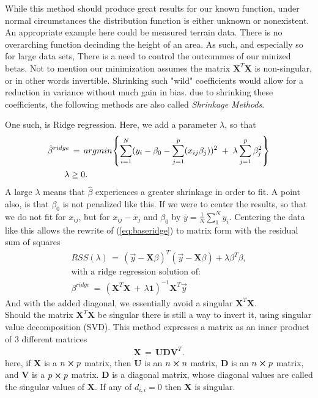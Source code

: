 \documentclass[ 12pt, a4paper ]{article}
\begin{document}
While this method should produce great results for our known function, under normal 
circumstances the distribution function is either unknown or nonexistent. An appropriate 
example here could be measured terrain data. There is no overarching function decinding the 
height of an area. As such, and especially so for large data sets, There is a need to control 
the outcommes of our minized betas. Not to mention our minimization assumes the matrix
$\mathbf{X}^T\mathbf{X}$ is non-singular, or in other words invertible. 
Shrinking such "wild" coefficients would allow for a reduction in variance without much gain
in bias. due to shrinking these coefficients, the following methods are also called 
\textit{Shrinkage Methods}. 

One such, is Ridge regression. Here, we add a parameter $\lambda$, so that 
\begin{align}
    \hat{\beta}^{ridge} &\,=\, 
    argmin\qty{ \sum_{i=1}^N (y_i - \beta_0 - \sum_{j=1}^p(x_{ij}\beta_j) )^2 
        \;+\; \lambda \sum_{j=1}^p \beta_j^2 }\label{eq:baseridge} \\
    \lambda &\geq 0. \nonumber
\end{align}
A large $\lambda$ means that $\hat{\beta}$ experiences a greater shrinkage in order to fit.
A point also, is that $\beta_0$ is not penalized like this. If we were to center the results, 
so that we do not fit for $x_{ij}$, but for $x_{ij} - \overline{x}_j$ and $\beta_0$ by 
$ \overline{y} = \frac{1}{N} \sum_1^N y_i$. %
Centering the data like this allows the rewrite of (\ref{eq:baseridge}) to matrix form
with the residual sum of squares
\begin{align}
    RSS(\lambda) \,=\, (\vec{y} - \mathbf{X}\beta)^T (\vec{y} - \mathbf{X}\beta)
        +   \lambda \beta^T\beta, \\
    \text{with a ridge regression solution of:}\nonumber \\
    \beta^{ridge} \,=\, (\mathbf{X}^T\mathbf{X} \,+\, \lambda \mathbf{1})^{-1}\mathbf{X}^T\vec{y}
    \label{eq:ridgesol}
\end{align}
And with the added diagonal, we essentially avoid a singular $\mathbf{X}^T\mathbf{X}$.\\

Should the matrix $\mathbf{X}^T \mathbf{X}$ be singular there is still a way to invert it, 
using singular value decomposition (SVD). This method expresses a matrix as an inner product 
of 3 different matrices\cite{}%
\begin{align}
    \mathbf{X} \,=\, \mathbf{U}\mathbf{D}\mathbf{V}^T.\label{eq:svdX}
\end{align}
here, if $\mathbf{X}$ is a $n\cross p$ matrix, then $\mathbf{U}$ is an $n \cross n$ matrix, 
$\mathbf{D}$ is an $n\cross p$ matrix, and $\mathbf{V}$ is a $p\cross p$ matrix. $\mathbf{D}$
is a diagonal matrix, whose diagonal values are called the singular values of $\mathbf{X}$.
If any of $d_{i,i}=0$ then $\mathbf{X}$ is singular. 
\end{document}
